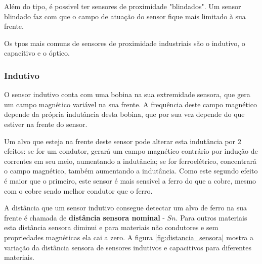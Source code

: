 Além do tipo, é possivel ter sensores de proximidade "blindados". Um sensor blindado faz com que o campo de atuação do sensor fique mais limitado à sua frente.

Os tpos mais comuns de sensores de proximidade industriais são o indutivo, o capacitivo e o óptico.

\subsubsection{Indutivo}
\label{subs:Indutivo}
O sensor indutivo conta com uma bobina na sua extremidade sensora, que gera um campo magnético variável na sua frente. A frequência deste campo magnético depende da própria indutância desta bobina, que por sua vez depende do que estiver na frente do sensor.

Um alvo que esteja na frente deste sensor pode alterar esta indutância por 2 efeitos: se for um condutor, gerará um campo magnético contrário por indução de correntes em seu meio, aumentando a indutância; se for ferroelétrico, concentrará o campo magnético, também aumentando a indutância. Como este segundo efeito é maior que o primeiro, este sensor é mais sensível a ferro do que a cobre, mesmo com o cobre sendo melhor condutor que o ferro.

A distância que um sensor indutivo consegue detectar um alvo de ferro na sua frente é chamada de \textbf{distância sensora nominal} - $Sn$. Para outros materiais esta distância sensora diminui e para materiais não condutores e sem propriedades magnéticas ela cai a zero. A figura \ref{fig:distancia_sensora} mostra a variação da distância sensora de sensores indutivos e capacitivos para diferentes materiais.

